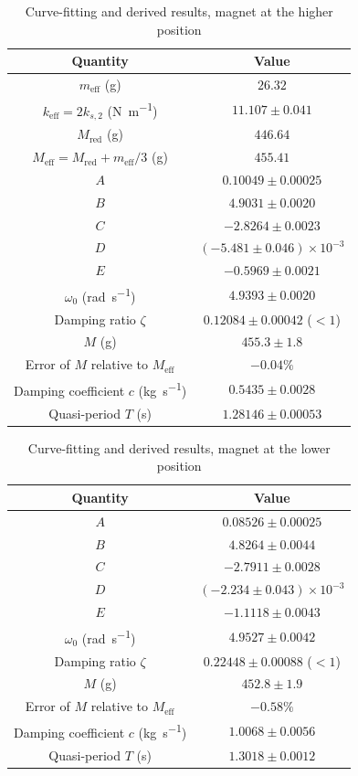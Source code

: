 \begin{table}[htb!]
\centering
\caption{Curve-fitting and derived results, magnet at the higher position}
\begin{tabular}{cc}
\toprule
Quantity & Value \\
\midrule
$m_{\text{eff}}$ (\unit{\g}) & $26.32$ \\
$k_{\text{eff}}=2k_{s,2}$ (\unit{\N\per\m}) & $11.107 \pm 0.041$ \\
$M_{\text{red}}$ (\unit{\g}) & $446.64$ \\
$M_{\text{eff}}=M_{\text{red}}+m_{\text{eff}}/3$ (\unit{\g}) & $455.41$ \\
$A$ & $0.10049 \pm 0.00025$ \\
$B$ & $4.9031 \pm 0.0020$ \\
$C$ & $-2.8264 \pm 0.0023$ \\
$D$ & $(-5.481 \pm 0.046)\times 10^{-3}$ \\
$E$ & $-0.5969 \pm 0.0021$ \\
$\omega_{0}$ (\unit{\radian\per\s}) & $4.9393 \pm 0.0020$ \\
Damping ratio $\zeta$ & $0.12084 \pm 0.00042$ ($<1$) \\
$M$ (\unit{\g}) & $455.3 \pm 1.8$ \\
Error of $M$ relative to $M_{\text{eff}}$ & $-0.04\%$ \\
Damping coefficient $c$ (\unit{\kg\per\s}) & $0.5435 \pm 0.0028$ \\
Quasi-period $T$ (\unit{\s}) & $1.28146 \pm 0.00053$ \\
\bottomrule
\end{tabular}
\end{table}
\begin{table}[htb!]
\centering
\caption{Curve-fitting and derived results, magnet at the lower position}
\begin{tabular}{cc}
\toprule
Quantity & Value \\
\midrule
$A$ & $0.08526 \pm 0.00025$ \\
$B$ & $4.8264 \pm 0.0044$ \\
$C$ & $-2.7911 \pm 0.0028$ \\
$D$ & $(-2.234 \pm 0.043)\times 10^{-3}$ \\
$E$ & $-1.1118 \pm 0.0043$ \\
$\omega_{0}$ (\unit{\radian\per\s}) & $4.9527 \pm 0.0042$ \\
Damping ratio $\zeta$ & $0.22448 \pm 0.00088$ ($<1$) \\
$M$ (\unit{\g}) & $452.8 \pm 1.9$ \\
Error of $M$ relative to $M_{\text{eff}}$ & $-0.58\%$ \\
Damping coefficient $c$ (\unit{\kg\per\s}) & $1.0068 \pm 0.0056$ \\
Quasi-period $T$ (\unit{\s}) & $1.3018 \pm 0.0012$ \\
\bottomrule
\end{tabular}
\end{table}
